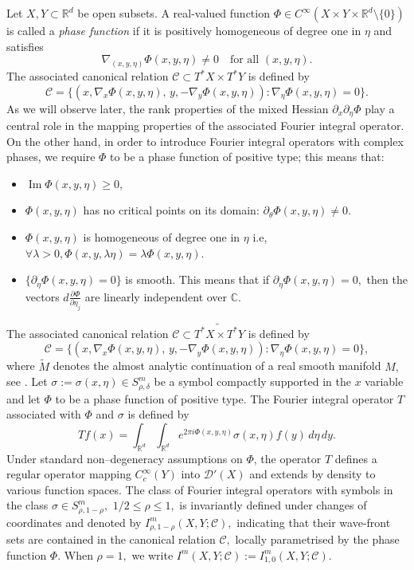 \documentclass[12pt, reqno]{amsart}
\theoremstyle{definition}
\theoremstyle{remark}
\numberwithin{equation}{section}
\begin{document}
Let $X,Y\subset\mathbb{R}^d$ be open subsets. A real-valued function
$\Phi\in C^\infty(X\times Y\times\mathbb{R}^d\setminus\{0\})$ is called a
\emph{phase function} if it is positively homogeneous of degree one in $\eta$ and
satisfies
\[
\nabla_{(x,y,\eta)}\Phi(x,y,\eta)\neq0
\quad\text{for all }(x,y,\eta).
\]
The associated canonical relation $\mathcal{C}\subset T^*X\times T^*Y$ is defined by
\[
\mathcal{C}
=
\{(x,\nabla_x\Phi(x,y,\eta),\,y,-\nabla_y\Phi(x,y,\eta)) :
\nabla_\eta\Phi(x,y,\eta)=0\}.
\]As we will observe later, the rank properties of the mixed Hessian $\partial_x\partial_\eta\Phi$ play a
central role in the mapping properties of the associated Fourier integral
operator. On the other hand, in order to introduce Fourier integral operators with complex phases, we require  $\Phi$ to be a phase function of positive type; this means that:
    \begin{itemize}
        \item  $\operatorname{Im} \Phi(x,y,\eta)\ge 0$,
        \item $\Phi(x,y,\eta)$ has no critical points on its domain: $\partial_{\theta} \Phi(x,y,\eta)\neq 0.$
        \item $\Phi(x,y,\eta)$ is homogeneous of degree one in $\eta$ i.e, $\forall \lambda>0, \Phi(x,y,\lambda\eta)=\lambda\Phi(x,y,\eta).$
        \item $\{\partial_\eta\Phi(x,y,\eta)=0\}$ is smooth. This means that if $\partial_\eta\Phi(x,y,\eta)=0,$ then the  vectors $d\frac{\partial\Phi}{\partial\eta_j}$ are linearly independent over $\mathbb{C}.$
    \end{itemize}
    The associated canonical relation $\mathcal{C}\subset \widetilde{T^*X\times T^*Y}$ is defined by
\[
\mathcal{C}
=
\{(x,\nabla_x\Phi(x,y,\eta),\,y,-\nabla_y\Phi(x,y,\eta)) :
\nabla_\eta\Phi(x,y,\eta)=0\},
\] where $\widetilde{M}$ denotes the almost analytic continuation of a real smooth manifold $M,$ see \cite{Melin-Sjostrand1976}.
Let $\sigma:=\sigma(x,\eta)\in S^m_{\rho,\delta}$ be a
symbol compactly supported in the $x$ variable and let  $\Phi$ to be a phase function of positive type. The Fourier integral operator $T$ associated with $\Phi$ and $\sigma$ is
 defined by
\begin{equation}\label{FIO}
  Tf(x)
=
\int_{\mathbb{R}^d}\int_{\mathbb{R}^d}
e^{2\pi i \Phi(x,y,\eta)}\sigma(x,\eta)f(y)\,d\eta\,dy.  
\end{equation}
Under standard non–degeneracy assumptions on $\Phi$, the operator $T$ defines a
regular operator mapping $C_c^\infty(Y)$ into $\mathcal{D}'(X)$ and extends by density
to various function spaces. The class of Fourier integral operators with symbols in the class $\sigma\in S^m_{\rho,1-\rho},$ $1/2\leq \rho\leq 1,$ is invariantly defined under changes of coordinates and denoted by $I^m_{\rho,1-\rho}(X,Y;\mathcal{C}),$ indicating that their wave-front sets are contained in the canonical relation $\mathcal{C},$ locally parametrised by the phase function $\Phi.$ When $\rho=1,$ we write  $I^m(X,Y;\mathcal{C}):=I^m_{1,0}(X,Y;\mathcal{C}).$
\end{document}
